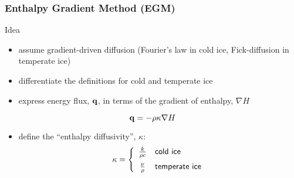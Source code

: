 \documentclass[hide notes,intlimits]{beamer}
\begin{document}
\begin{frame}
  \frametitle{Enthalpy Gradient Method (EGM)}
  \begin{block}{Idea}
  \begin{itemize}
  \item assume gradient-driven diffusion (Fourier's law in cold ice, Fick-diffusion in temperate ice)
  \item differentiate the definitions for cold and temperate ice 
  \item express energy flux, ${\bf q}$, in terms of the gradient of enthalpy, $\nabla H$
   \end{itemize}
  \begin{equation*}
  {\bf q} = -\rho\kappa\nabla H
  \end{equation*}
  \begin{itemize}
  \item define the ``enthalpy diffusivity'', $\kappa$:
  \begin{equation*}
   \kappa =  \left\{
      \begin{array}{cl}
      \frac{k}{\rho c}  & \textsf{cold ice}  \vspace{.5em} \\
      \frac{\nu}{\rho} & \textsf{temperate ice}
      \end{array}
      \right.
  \end{equation*}
  \end{itemize} 
  \end{block}	
\end{frame}
\end{document}
